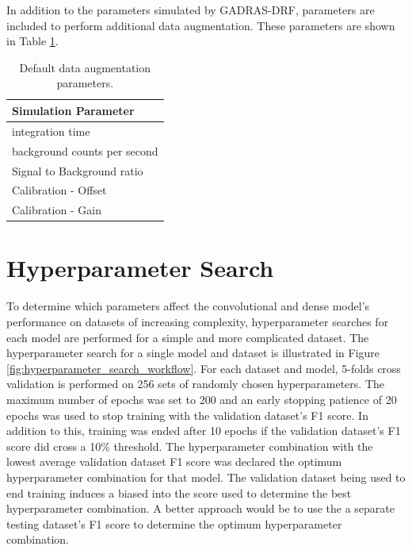 In addition to the parameters simulated by GADRAS-DRF, parameters are included to perform additional data augmentation. These parameters are shown in Table \ref{table:all_variable_simulation_parameters}.

\begin{table}[H]
\centering
\caption{Default data augmentation parameters.}
\begin{tabular}{l}
\hline
\textbf{Simulation Parameter} \\ \hline
integration time \\ 
background counts per second \\ 
Signal to Background ratio \\ 
Calibration - Offset \\ 
Calibration - Gain \\ \hline
\end{tabular}
\label{table:all_variable_simulation_parameters}
\end{table}

\section{Hyperparameter Search}

To determine which parameters affect the convolutional and dense model's performance on datasets of increasing complexity, hyperparameter searches for each model are performed for a simple and more complicated dataset. The hyperparameter search for a single model and dataset is illustrated in Figure \ref{fig:hyperparameter_search_workflow}. For each dataset and model, 5-folds cross validation is performed on 256 sets of randomly chosen hyperparameters. The maximum number of epochs was set to 200 and an early stopping patience of 20 epochs was used to stop training with the validation dataset's F1 score. In addition to this, training was ended after 10 epochs if the validation dataset's F1 score did cross a 10\% threshold. The hyperparameter combination with the lowest average validation dataset F1 score was declared the optimum hyperparameter combination for that model. The validation dataset being used to end training induces a biased into the score used to determine the best hyperparameter combination. A better approach would be to use the a separate testing dataset's F1 score to determine the optimum hyperparameter combination.

